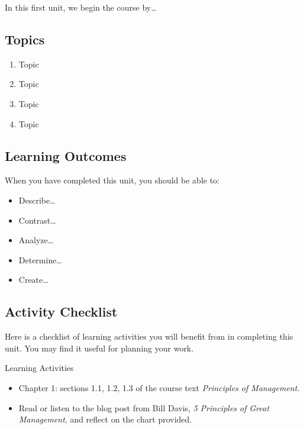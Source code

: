 \documentclass[
]{book}
\providecommand{\tightlist}{%
  \setlength{\itemsep}{0pt}\setlength{\parskip}{0pt}}
\begin{document}
In this first unit, we begin the course by\ldots{}

\hypertarget{topics-3}{%
\subsection*{Topics}\label{topics-3}}

\begin{enumerate}
\def\labelenumi{\arabic{enumi}.}
\tightlist
\item
  Topic\\
\item
  Topic\\
\item
  Topic\\
\item
  Topic
\end{enumerate}

\hypertarget{learning-outcomes-3}{%
\subsection*{Learning Outcomes}\label{learning-outcomes-3}}

When you have completed this unit, you should be able to:

\begin{itemize}
\tightlist
\item
  Describe\ldots{}
\item
  Contrast\ldots{}
\item
  Analyze\ldots{}
\item
  Determine\ldots{}
\item
  Create\ldots{}
\end{itemize}

\hypertarget{activity-checklist-3}{%
\subsection*{Activity Checklist}\label{activity-checklist-3}}

Here is a checklist of learning activities you will benefit from in completing this unit. You may find it useful for planning your work.

\begin{reflect}
{Learning Activities }

\begin{itemize}
\tightlist
\item
  Chapter 1: sections 1.1, 1.2, 1.3 of the course text \emph{Principles of Management.}\\
\item
  Read or listen to the blog post from Bill Davis, \emph{5 Principles of Great Management}, and reflect on the chart provided.
\end{itemize}
\end{reflect}
\end{document}
